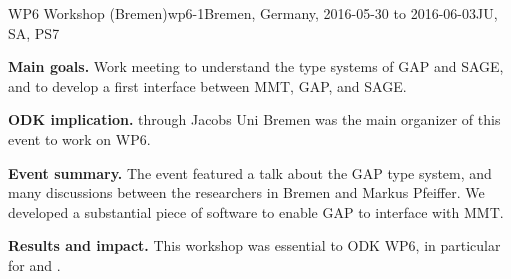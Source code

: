 \begin{event}{WP6 Workshop (Bremen)}{wp6-1}{Bremen, Germany, 2016-05-30 to 2016-06-03}{JU, SA, PS}{7}{}

\textbf{Main goals.} Work meeting to understand the type systems of GAP and
SAGE, and to develop a first interface between MMT, GAP, and SAGE.

\textbf{ODK implication.} \ODK through Jacobs Uni Bremen was the main organizer of this
event to work on WP6.

\textbf{Event summary.} The event featured a talk about the GAP type system, and
many discussions between the researchers in Bremen and Markus Pfeiffer. We
developed a substantial piece of software to enable GAP to interface with MMT.

\textbf{Results and impact.}  This workshop was essential to ODK WP6,
in particular for  and
.

\end{event}
